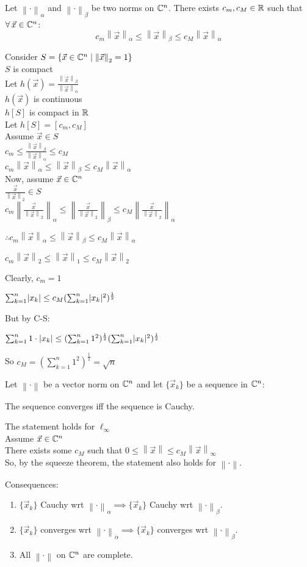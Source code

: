 \documentclass[letterpaper,12pt,fleqn]{article}
\newcommand{\norm}[1]{\left\lVert#1\right\rVert}
\newcommand{\nc}{\norm{\cdot}}
\newcommand{\vx}{\vec{x}}
\renewcommand{\a}{\alpha}
\renewcommand{\b}{\beta}
\begin{document}
\begin{theorem}
  Let $\nc_{\a}$ and $\nc_{\b}$ be two norms on $\mathbb{C}^n$. There exists
  $c_m,c_M\in\mathbb{R}$ such that $\forall\,\vx\in\C^n$:
  \[c_m\norm{\vx}_{\a}\le\norm{\vx}_{\b}\le c_M\norm{\vx}_{\a}\]
\end{theorem}

\begin{theproof}
  Consider $S=\{\vx\in\C^n\mid\norm{\vx}_2=1\}$ \\
  $S$ is compact \\
  Let $h(\vx)=\frac{\norm{\vx}_{\b}}{\norm{\vx}_{\a}}$ \\
  $h(\vx)$ is continuous \\
  $h[S]$ is compact in $\mathbb{R}$ \\
  Let $h[S]=[c_m,c_M]$ \\
  Assume $\vx\in S$ \\
  $c_m\le\frac{\norm{\vx}_{\b}}{\norm{\vx}_{\a}}\le c_M$ \\
  $c_m\norm{\vx}_{\a}\le\norm{\vx}_{\b}\le c_M\norm{\vx}_{\a}$ \\
  Now, assume $\vx\in\C^n$ \\
  $\frac{\vx}{\norm{\vx}_2}\in S$ \\
  $c_m\norm{\frac{\vx}{\norm{\vx}_2}}_{\a}\le
  \norm{\frac{\vx}{\norm{\vx}_2}}_{\b}\le
  c_M\norm{\frac{\vx}{\norm{\vx}_2}}_{\a}$

  $\therefore c_m\norm{\vx}_{\a}\le\norm{\vx}_{\b}\le c_M\norm{\vx}_{\a}$
\end{theproof}

\begin{example}
  $c_m\norm{\vx}_2\le\norm{\vx}_1\le c_M\norm{\vx}_2$

  Clearly, $c_m=1$

  $\sum_{k=1}^n\lvert x_k\rvert\le c_M(\sum_{k=1}^n\lvert x_k\rvert^2)^{\frac{1}{2}}$

  But by C-S:

  $\sum_{k=1}^n1\cdot\lvert x_k\rvert\le
  (\sum_{k=1}^n1^2)^{\frac{1}{2}}(\sum_{k=1}^n\lvert x_k\rvert^2)^{\frac{1}{2}}$

  So $c_M=(\sum_{k=1}^n1^2)^{\frac{1}{2}}=\sqrt{n}$
\end{example}

\begin{theorem}
  Let $\nc$ be a vector norm on $\mathbb{C}^n$ and let $\{\vx_k\}$ be a sequence in
  $\mathbb{C}^n$:

  The sequence converges iff the sequence is Cauchy.
\end{theorem}
\newpage
\begin{theproof}
  The statement holds for $\ell_{\infty}$ \\
  Assume $\vx\in\C^n$ \\
  There exists some $c_M$ such that
  $0\le\norm{\vx}\le c_M\norm{\vx}_{\infty}$ \\
  So, by the squeeze theorem, the statement also holds for $\nc$.
\end{theproof}

Consequences:
\begin{enumerate}
\item $\{\vx_k\}$ Cauchy wrt $\nc_{\a}\implies\{\vx_k\}$ Cauchy wrt
  $\nc_{\b}$.
\item $\{\vx_k\}$ converges wrt $\nc_{\a}\implies\{\vx_k\}$ converges wrt
  $\nc_{\b}$.
\item All $\nc$ on $\mathbb{C}^n$ are complete.
\end{enumerate}
\end{document}

